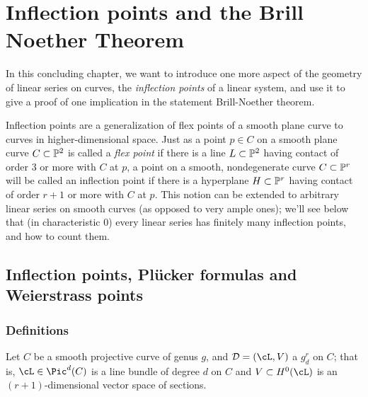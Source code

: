 

\chapter{Inflection points and the Brill Noether Theorem}
\label{InflectionsChapter}


In this concluding chapter, we want to introduce one more aspect of the geometry of linear series on curves, the \emph{inflection points} of a linear system, and use it to give a proof of one implication in the statement Brill-Noether theorem.

Inflection points are a generalization of flex points of a smooth plane curve to curves in higher-dimensional space. Just as a point $p \in C$ on a smooth plane curve $C \subset \PP^2$ is called a \emph{flex point} if there is a line $L \subset \PP^2$ having contact of order 3 or more with $C$ at $p$, a point on a smooth, nondegenerate curve $C \subset \PP^r$ will be called an inflection point if there is a hyperplane $H \subset \PP^r$ having contact of order $r+1$ or more with $C$ at $p$. This notion can be extended to arbitrary linear series on smooth curves (as opposed to very ample ones); we'll see below that (in characteristic 0) every linear series has finitely many inflection points, and how to count them.


\section{Inflection points,  Pl\"ucker formulas and Weierstrass points}

\subsection{Definitions}

Let $C$ be a smooth projective curve of genus $g$, and $\cD = (\cL,V)$ a $g^r_d$ on $C$; that is, $\cL \in \Pic^d(C)$ is a line bundle of degree $d$ on $C$ and $V \subset H^0(\cL)$ is an $(r+1)$-dimensional vector space of sections. 

